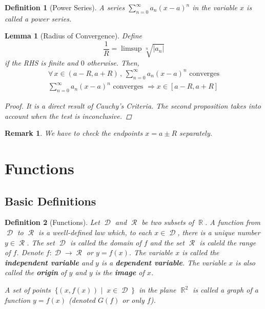 \documentclass[12pt]{article}
\let\RA\Rightarrow
\newcommand{\set}[2]{\left\{{#1}\;\middle|\;{#2}\right\}}
\newcommand{\Forall}[1]{\forall\,{#1}\,,\,}
\DeclareMathOperator{\R}{\mathbb{R}}
\DeclareMathOperator{\D}{\mathcal{D}}
\DeclareMathOperator{\Ran}{\mathcal{R}}
\newtheorem{definition}{Definition}[subsection]
\newtheorem{lemma}{Lemma}[subsection]
\newtheorem{remark}{Remark}[subsection]
\begin{document}
\begin{definition}[Power Series]
  A series $\displaystyle\sum_{n=0}^\infty a_n (x-a)^n$ in the variable $x$ is called a power series.
\end{definition}

\begin{lemma}[Radius of Convergence]
  Define $$\frac{1}{R}=\limsup\sqrt[n]{|a_n|}$$ if the RHS is finite and $0$ otherwise. Then,
  \begin{align*}
    \Forall{x\in(a-R,a+R)}\sum_{n=0}^\infty a_n(x-a)^n\text{ converges}\\
    \sum_{n=0}^\infty a_n(x-a)^n\text{ converges }\RA x\in[a-R,a+R]
  \end{align*}
  \begin{proof}
    It is a direct result of Cauchy's Criteria. The second proposition takes into account when the test is inconclusive.
  \end{proof}
\end{lemma}

\begin{remark}
  We have to check the endpoints $x=a\pm R$ separately.
\end{remark}

\pagebreak

\section{Functions}

\subsection{Basic Definitions}

\begin{definition}[Functions]
  Let $\D$ and $\Ran$ be two subsets of $\R$. A function from $\D$ to $\Ran$ is a weell-defined law which, to each $x\in\D$, there is a unique number $y\in\Ran$. The set $\D$ is called the domain of $f$ and the set $\Ran$ is caleld the range of $f$. Denote $f:\D\to\Ran$ or $y=f(x)$. The variable $x$ is called the \textbf{independent variable} and $y$ is a \textbf{dependent variable}. The variable $x$ is also called the \textbf{origin} of $y$ and $y$ is the \textbf{image} of $x$.

  A set of points $\set{\big(\;x,f(x)\;\big)}{x\in\D}$ in the plane $\R^2$ is called a graph of a function $y=f(x)$ (denoted $G(f)$ or only $f$).
\end{definition}
\end{document}
